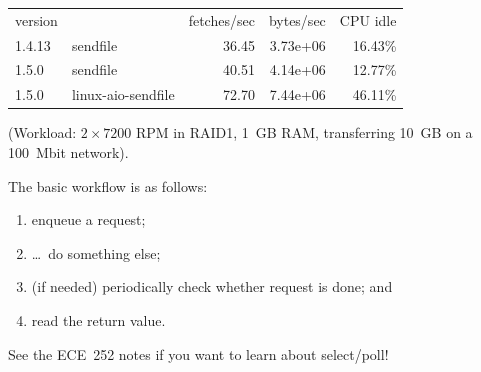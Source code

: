     \begin{tabular}{llrrr}
    version & & fetches/sec & bytes/sec & CPU idle \\
    1.4.13 & sendfile & 36.45 & 3.73e+06 & 16.43\% \\
    1.5.0 & sendfile & 40.51 & 4.14e+06 & 12.77\% \\
    1.5.0 & linux-aio-sendfile & 72.70 & 7.44e+06 & 46.11\% \\
    \end{tabular}

(Workload: $2\times 7200$ RPM in RAID1, 1~GB RAM, transferring 10~GB on a 100~Mbit network).

The basic workflow is as follows: 
   \begin{enumerate}[noitemsep]
     \item enqueue a request;
     \item \ldots ~do something else;
     \item (if needed) periodically check whether request is done; and
     \item read the return value.
   \end{enumerate}
   
   See the ECE~252 notes if you want to learn about select/poll!




